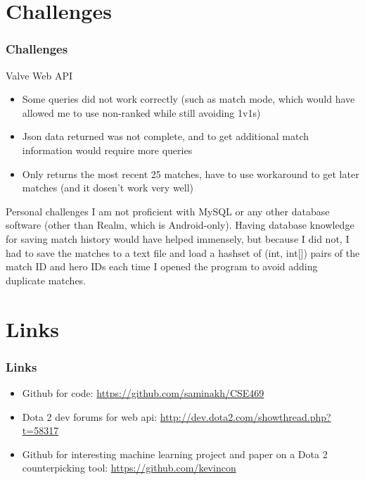 \documentclass{beamer}
\begin{document}
\section{Challenges}
\begin{frame}
\frametitle{Challenges}
\begin{block}{Valve Web API}
\begin{itemize}
	\item Some queries did not work correctly (such as match mode, which would have allowed me to use non-ranked while still avoiding 1v1s)
	\item Json data returned was not complete, and to get additional match information would require more queries
	\item Only returns the most recent 25 matches, have to use workaround to get later matches (and it dosen't work very well)
\end{itemize}
\end{block}
\begin{block}{Personal challenges}
I am not proficient with MySQL or any other database software (other than Realm, which is Android-only). Having database knowledge for saving match history would have helped immensely, but because I did not, I had to save the matches to a text file and load a hashset of (int, int[]) pairs of the match ID and hero IDs each time I opened the program to avoid adding duplicate matches. 
\end{block}
\end{frame}

\section{Links}

\begin{frame}
\frametitle{Links}
\begin{itemize}
	\item Github for code: \url{https://github.com/saminakh/CSE469}
	\item Dota 2 dev forums for web api: \url{http://dev.dota2.com/showthread.php?t=58317}
	\item Github for interesting machine learning project and paper on a Dota 2 counterpicking tool: \url{https://github.com/kevincon}
\end{itemize}
\end{frame}

\end{document}
